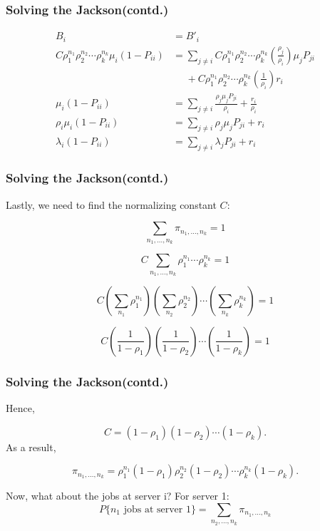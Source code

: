 \documentclass[10pt,notes]{beamer}
\begin{document}
\begin{frame}
    \frametitle{Solving the Jackson(contd.)}
    \begin{align*}
        B_i &= B'_i \\
        C \rho_1^{n_1} \rho_2^{n_2} \cdots \rho_k^{n_k} \mu_i (1 - P_{ii}) &= \sum_{j \neq i} C \rho_1^{n_1} \rho_2^{n_2} \cdots \rho_k^{n_k} \left( \frac{\rho_j}{\rho_i} \right) \mu_j P_{ji} \\
        &\phantom{=} + C \rho_1^{n_1} \rho_2^{n_2} \cdots \rho_k^{n_k} \left( \frac{1}{\rho_i} \right) r_i \\
        \mu_i (1 - P_{ii}) &= \sum_{j \neq i} \frac{\rho_j \mu_j P_{ji}}{\rho_i} + \frac{r_i}{\rho_i} \\
        \rho_i \mu_i (1 - P_{ii}) &= \sum_{j \neq i} \rho_j \mu_j P_{ji} + r_i \\
        \lambda_i (1 - P_{ii}) &= \sum_{j \neq i} \lambda_j P_{ji} + r_i
    \end{align*}

\end{frame}

\begin{frame}
    \frametitle{Solving the Jackson(contd.)}
    Lastly, we need to find the normalizing constant \( C \):

    \[
    \sum_{n_1,\ldots,n_k} \pi_{n_1,\ldots,n_k} = 1
    \]
    
    \[
    C \sum_{n_1,\ldots,n_k} \rho_1^{n_1} \cdots \rho_k^{n_k} = 1
    \]
    
    \[
    C \left( \sum_{n_1} \rho_1^{n_1} \right) \left( \sum_{n_2} \rho_2^{n_2} \right) \cdots \left( \sum_{n_k} \rho_k^{n_k} \right) = 1
    \]
    
    \[
    C \left( \frac{1}{1 - \rho_1} \right) \left( \frac{1}{1 - \rho_2} \right) \cdots \left( \frac{1}{1 - \rho_k} \right) = 1
    \]
    
\end{frame}

\begin{frame}
    \frametitle{Solving the Jackson(contd.)}
    Hence,
    
    \[
    C = (1 - \rho_1) (1 - \rho_2) \cdots (1 - \rho_k).
    \]
    As a result,
    
    \[
    \pi_{n_1,\ldots,n_k} = \rho_1^{n_1} (1 - \rho_1) \rho_2^{n_2} (1 - \rho_2) \cdots \rho_k^{n_k} (1 - \rho_k).
    \]

    
    Now, what about the jobs at server i?
    For server 1:
    \[
    P\{n_1 \text{ jobs at server } 1\} = \sum_{n_2,\ldots,n_k} \pi_{n_1,\ldots,n_k}
    \]
    
\end{frame}
\end{document}
